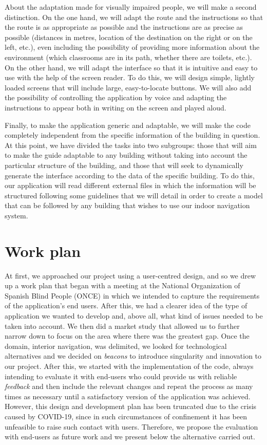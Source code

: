 About the adaptation made for visually impaired people, we will make a second distinction. On the one hand, we will adapt the route and the instructions so that the route is as appropriate as possible and the instructions are as precise as possible (distances in metres, location of the destination on the right or on the left, etc.), even including the possibility of providing more information about the environment (which classrooms are in its path, whether there are toilets, etc.). On the other hand, we will adapt the interface so that it is intuitive and easy to use with the help of the screen reader. To do this, we will design simple, lightly loaded screens that will include large, easy-to-locate buttons. We will also add the possibility of controlling the application by voice and adapting the instructions to appear both in writing on the screen and played aloud.

Finally, to make the application generic and adaptable, we will make the code completely independent from the specific information of the building in question. At this point, we have divided the tasks into two subgroups: those that will aim to make the guide adaptable to any building without taking into account the particular structure of the building, and those that will seek to dynamically generate the interface according to the data of the specific building. To do this, our application will read different external files in which the information will be structured following some guidelines that we will detail in order to create a model that can be followed by any building that wishes to use our indoor navigation system.

\section{Work plan}
\label{sec:workPlan}


At first, we approached our project using a user-centred design, and so we drew up a work plan that began with a meeting at the National Organization of Spanish Blind People (ONCE) in which we intended to capture the requirements of the application's end users. After this, we had a clearer idea of the type of application we wanted to develop and, above all, what kind of issues needed to be taken into account. We then did a market study that allowed us to further narrow down to focus on the area where there was the greatest gap. Once the domain, interior navigation, was delimited, we looked for technological alternatives and we decided on \textit{beacons} to introduce singularity and innovation to our project. After this, we started with the implementation of the code, always intending to evaluate it with end-users who could provide us with reliable \textit{feedback} and then include the relevant changes and repeat the process as many times as necessary until a satisfactory version of the application was achieved. However, this design and development plan has been truncated due to the crisis caused by COVID-19, since in such circumstances of confinement it has been unfeasible to raise such contact with users. Therefore, we propose the evaluation with end-users as future work and we present below the alternative carried out.

